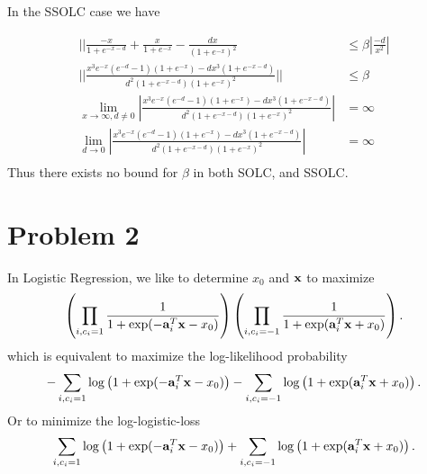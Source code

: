 \documentclass{article} %
\renewcommand\a{{\bf a}}
\newcommand\x{{\bf x}}
\renewcommand\a{{\bf a}}
\begin{document}
\begin{itemize}
 In the SSOLC case we have


\begin{equation*}
\begin{aligned}
|| \frac{-x}{1 + e^{-x -d}} + \frac{ x}{1 + e^{-x}} - \frac{dx}{( 1 + e^{-x})^2} &\leq \beta |\frac{-d}{x^2} | \\ 
||\frac{ x^{3} e^{-x}( e^{-d} - 1)(1 + e^{-x}) - dx^3 (1 + e^{-x -d})}{ d^2 ( 1 + e^{-x - d} )(1 + e^{-x})^2}|| &\leq \beta \\ 
\lim_{x \to \infty, d \neq 0}  |\frac{ x^{3} e^{-x}( e^{-d} - 1)(1 + e^{-x}) - dx^3 (1 + e^{-x -d})}{ d^2 ( 1 + e^{-x - d} )(1 + e^{-x})^2}| &= \infty \\ 
\lim_{d \to 0}  |\frac{ x^{3} e^{-x}( e^{-d} - 1)(1 + e^{-x}) - dx^3 (1 + e^{-x -d})}{ d^2 ( 1 + e^{-x - d} )(1 + e^{-x})^2}| &= \infty \\ 
\end{aligned}
\end{equation*}
Thus there exists no bound for $\beta$ in both SOLC, and SSOLC. 



\end{itemize}


\section*{Problem 2}
In Logistic Regression, we like to determine $x_0$ and $\x$ to maximize
\[
\left(\prod_{i,c_i=1}\frac{1}{1+\exp(-\a_i^T\x-x_0)}\right)
\left(\prod_{i,c_i=-1}\frac{1}{1+\exp(\a_i^T\x+x_0)}\right).
\]
which is equivalent to maximize the log-likelihood probability
\[
-\sum_{i,c_i=1}\log\left(1+\exp(-\a_i^T\x-x_0)\right)-\sum_{i,c_i=-1}\log\left(1+\exp(\a_i^T\x+x_0)\right).
\]
Or to minimize the log-logistic-loss
\[
\sum_{i,c_i=1}\log\left(1+\exp(-\a_i^T\x-x_0)\right)+\sum_{i,c_i=-1}\log\left(1+\exp(\a_i^T\x+x_0)\right).
\]
\end{document}
